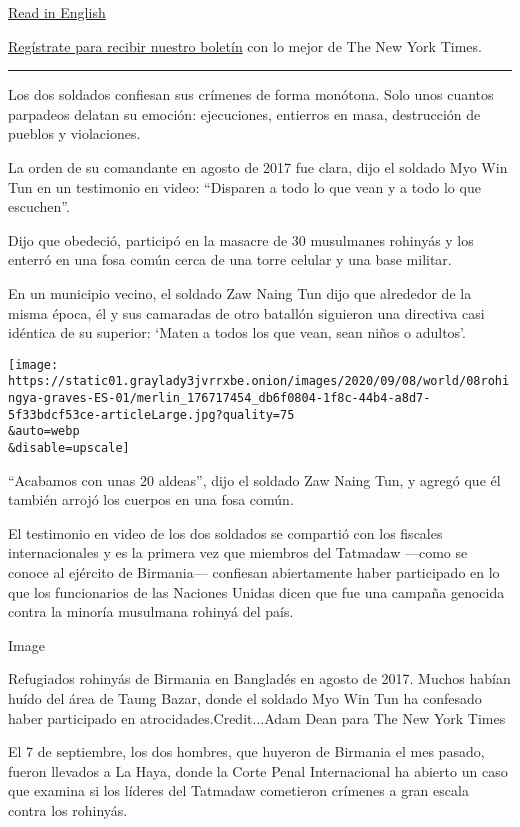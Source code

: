 \href{https://www.nytimes3xbfgragh.onion/2020/09/08/world/asia/myanmar-rohingya-genocide.html}{Read
in English}

\href{https://www.nytimes3xbfgragh.onion/newsletters/el-times}{Regístrate
para recibir nuestro boletín} con lo mejor de The New York Times.

\begin{center}\rule{0.5\linewidth}{\linethickness}\end{center}

Los dos soldados confiesan sus crímenes de forma monótona. Solo unos
cuantos parpadeos delatan su emoción: ejecuciones, entierros en masa,
destrucción de pueblos y violaciones.

La orden de su comandante en agosto de 2017 fue clara, dijo el soldado
Myo Win Tun en un testimonio en video: ``Disparen a todo lo que vean y a
todo lo que escuchen''.

Dijo que obedeció, participó en la masacre de 30 musulmanes rohinyás y
los enterró en una fosa común cerca de una torre celular y una base
militar.

En un municipio vecino, el soldado Zaw Naing Tun dijo que alrededor de
la misma época, él y sus camaradas de otro batallón siguieron una
directiva casi idéntica de su superior: `Maten a todos los que vean,
sean niños o adultos'.

\texttt{[image: https://static01.graylady3jvrrxbe.onion/images/2020/09/08/world/08rohingya-graves-ES-01/merlin\_176717454\_db6f0804-1f8c-44b4-a8d7-5f33bdcf53ce-articleLarge.jpg?quality=75\\\&auto=webp\\\&disable=upscale]}

``Acabamos con unas 20 aldeas'', dijo el soldado Zaw Naing Tun, y agregó
que él también arrojó los cuerpos en una fosa común.

El testimonio en video de los dos soldados se compartió con los fiscales
internacionales y es la primera vez que miembros del Tatmadaw ---como se
conoce al ejército de Birmania--- confiesan abiertamente haber
participado en lo que los funcionarios de las Naciones Unidas dicen que
fue una campaña genocida contra la minoría musulmana rohinyá del país.

Image

Refugiados rohinyás de Birmania en Bangladés en agosto de 2017. Muchos
habían huído del área de Taung Bazar, donde el soldado Myo Win Tun ha
confesado haber participado en atrocidades.Credit...Adam Dean para The
New York Times

El 7 de septiembre, los dos hombres, que huyeron de Birmania el mes
pasado, fueron llevados a La Haya, donde la Corte Penal Internacional ha
abierto un caso que examina si los líderes del Tatmadaw cometieron
crímenes a gran escala contra los rohinyás.

